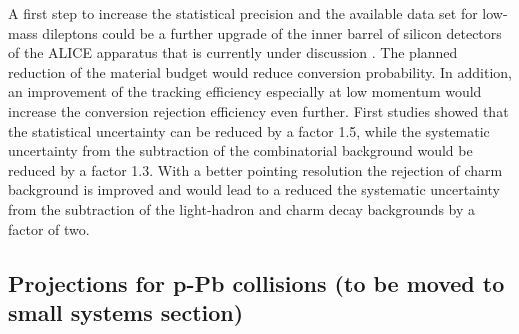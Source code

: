 \documentclass[../report.tex]{subfiles}
\providecommand{\main}{..}
\begin{document}
A first step to increase the statistical precision and the available data set for low-mass dileptons could be a further upgrade of the inner barrel of silicon detectors of the ALICE apparatus that is currently under discussion \cite{ALICE:ITS3LoI}. The planned reduction of the material budget would reduce conversion probability. In addition, an improvement of the tracking efficiency especially at low momentum would increase the conversion rejection efficiency even further. First studies \cite{ALICE:ITS3LoI} showed that the statistical uncertainty can be reduced by a factor 1.5, while the systematic uncertainty from the subtraction of the combinatorial background would be reduced by a factor 1.3. With a better pointing resolution the rejection of charm background is improved and would lead to a reduced the systematic uncertainty from the subtraction of the light-hadron and charm decay backgrounds by a factor of two. 

\subsection{Projections for p-Pb collisions (to be moved to small systems section)}


\end{document}
